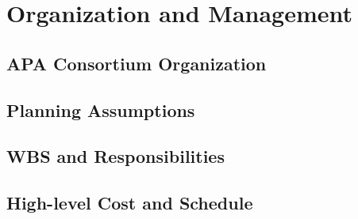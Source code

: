 \section{Organization and Management}
\label{sec:fdsp-apa-org}

\subsection{APA Consortium Organization}
\label{sec:fdsp-apa-org-consortium}


\subsection{Planning Assumptions}
\label{sec:fdsp-apa-org-assmp}


\subsection{WBS and Responsibilities}
\label{sec:fdsp-apa-org-wbs}

\subsection{High-level Cost and Schedule}
\label{sec:fdsp-apa-org-cs}

















